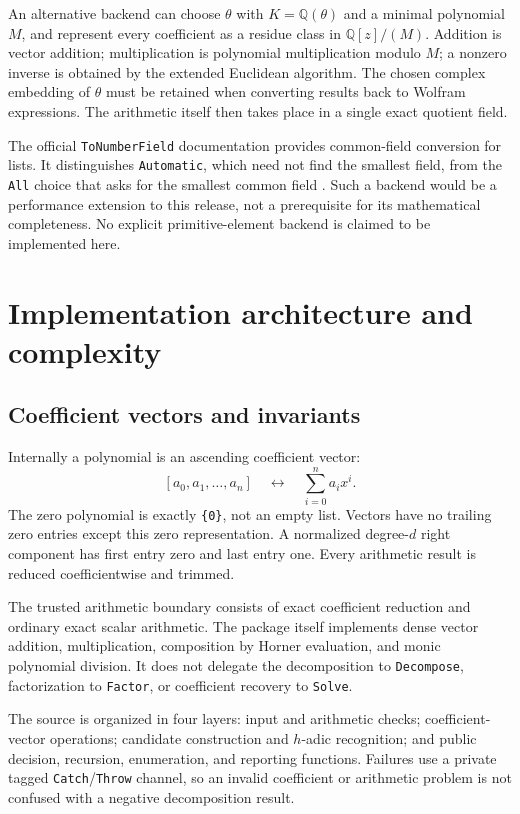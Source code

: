 \documentclass[11pt,letterpaper]{article}
\theoremstyle{definition}
\theoremstyle{remark}
\newcommand{\Q}{\mathbb Q}
\newcommand{\wt}[1]{\texttt{#1}}
\begin{document}
An alternative backend can choose $\theta$ with
$K=\Q(\theta)$ and a minimal polynomial $M$, and represent every
coefficient as a residue class in $\Q[z]/(M)$. Addition is vector
addition; multiplication is polynomial multiplication modulo $M$; a
nonzero inverse is obtained by the extended Euclidean algorithm.
The chosen complex embedding of $\theta$ must be retained when converting
results back to Wolfram expressions. The arithmetic itself then takes
place in a single exact quotient field.

The official \wt{ToNumberField} documentation provides common-field
conversion for lists. It distinguishes \wt{Automatic}, which need not
find the smallest field, from the \wt{All} choice that asks for the
smallest common field \cite{wl-tonumberfield}. Such a backend would be
a performance extension to this release, not a prerequisite for its
mathematical completeness. No explicit primitive-element backend is
claimed to be implemented here.

\clearpage
\section{Implementation architecture and complexity}
\label{sec:implementation}

\subsection{Coefficient vectors and invariants}
Internally a polynomial is an ascending coefficient vector:
\[
 [a_0,a_1,\ldots,a_n]\quad\longleftrightarrow\quad
 \sum_{i=0}^n a_i x^i.
\]
The zero polynomial is exactly \wt{\{0\}}, not an empty list.
Vectors have no trailing zero entries except this zero representation.
A normalized degree-$d$ right component has first entry zero and last
entry one. Every arithmetic result is reduced coefficientwise and trimmed.

The trusted arithmetic boundary consists of exact coefficient reduction
and ordinary exact scalar arithmetic. The package itself implements dense
vector addition, multiplication, composition by Horner evaluation, and
monic polynomial division. It does not delegate the decomposition to
\wt{Decompose}, factorization to \wt{Factor}, or coefficient recovery to
\wt{Solve}.

The source is organized in four layers: input and arithmetic checks;
coefficient-vector operations; candidate construction and $h$-adic
recognition; and public decision, recursion, enumeration, and reporting
functions. Failures use a private tagged \wt{Catch}/\wt{Throw} channel,
so an invalid coefficient or arithmetic problem is not confused with a
negative decomposition result.
\end{document}
